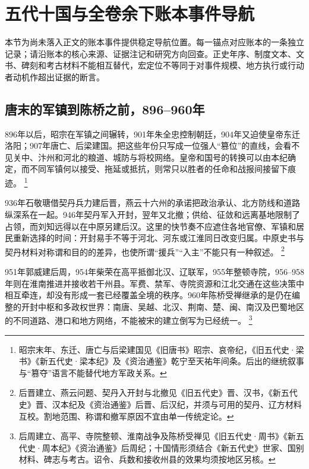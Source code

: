 \section{五代十国与全卷余下账本事件导航}
\label{sec:event-anchors-final-4}
本节为尚未落入正文的账本事件提供稳定导航位置。每一锚点对应账本的一条独立记录；请沿账本的核心来源、证据注记和研究方向回查。正史年序、制度文本、文书、碑刻和考古材料不能相互替代，宏定位不等同于对事件规模、地方执行或行动者动机作超出证据的断言。

\subsection{唐末的军镇到陈桥之前，896--960年}

896年以后，昭宗在军镇之间辗转，901年朱全忠控制朝廷，904年又迫使皇帝东迁洛阳；907年唐亡、后梁建国。把这些年份只写成一位强人“篡位”的直线，会看不见关中、汴州和河北的粮道、城防与将校网络。皇帝和国号的转换可以由本纪确定，而不同军镇何以接受、拖延或抵抗，则常只以胜者的任命和战报间接留下痕迹。%
\footnote{昭宗末年、东迁、唐亡与后梁建国见《旧唐书》昭宗、哀帝纪，《旧五代史·梁书》《新五代史·梁本纪》及《资治通鉴》乾宁至天祐年间条。后出的继统叙事与“篡夺”语言不能替代地方军政关系。}

936年石敬瑭借契丹兵力建后晋，燕云十六州的承诺把政治承认、北方防线和道路纵深系在一起。946年契丹军入开封，翌年又北撤；供给、征敛和远离基地限制了占领，而刘知远得以在中原另建后汉。这里的快节奏不应遮住各地官僚、军镇和居民重新选择的时间：开封易手不等于河北、河东或江淮同日改变归属。中原史书与契丹材料对称谓和目的的差异，也使所谓“援兵”“入主”不能只有一种叙述。%
\footnote{后晋建立、燕云问题、契丹入开封与北撤见《旧五代史》晋、汉书，《新五代史》晋、汉本纪及《资治通鉴》后晋、后汉纪，并须与可用的契丹、辽方材料互校。割地范围、称谓和撤军原因不宜由单一传统定论。}

951年郭威建后周，954年柴荣在高平抵御北汉、辽联军，955年整顿寺院，956--958年则在淮南推进并接收若干州县。军费、禁军、寺院资源和江北交通在这些决策中相互牵连，却没有形成一套已经覆盖全境的秩序。960年陈桥受禅继承的是仍在编整的开封中枢和多政权世界：南唐、吴越、北汉、荆南、楚、闽、南汉及巴蜀地区的不同道路、港口和地方网络，不能被宋的建立倒写为已经统一。%
\footnote{后周建立、高平、寺院整顿、淮南战争及陈桥受禅见《旧五代史·周书》《新五代史·周本纪》《资治通鉴》后周纪；十国情形须结合《新五代史》世家、国别材料、碑志与考古。诏令、兵数和接收州县的效果均须按地区另核。}

